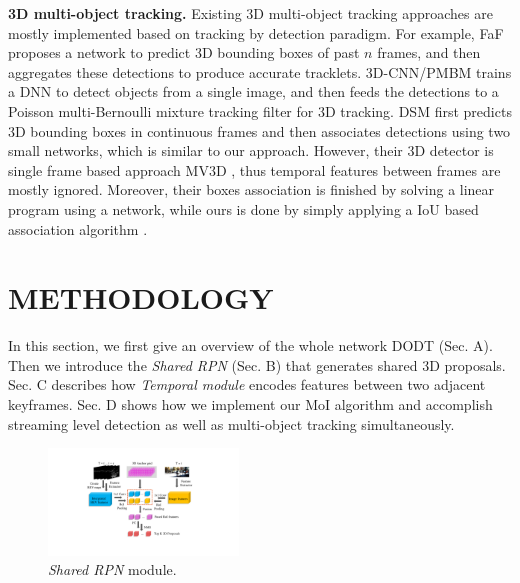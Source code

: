 \documentclass[letterpaper, 10pt, conference]{ieeeconf}  %
\begin{document}
\textbf{3D multi-object tracking.} Existing 3D multi-object tracking approaches are mostly implemented based on tracking by detection paradigm. For example, FaF \cite{luo2018fast} proposes a network to predict 3D bounding boxes of past $n$ frames, and then aggregates these detections to produce accurate tracklets. 3D-CNN/PMBM \cite{scheidegger2018mono} trains a DNN to detect objects from a single image, and then feeds the detections to a Poisson multi-Bernoulli mixture tracking filter for 3D tracking. DSM \cite{frossard2018end} first predicts 3D bounding boxes in continuous frames and then associates detections using two small networks, which is similar to our approach. However, their 3D detector is single frame based approach MV3D \cite{chen2017multi}, thus temporal features between frames are mostly ignored. Moreover, their boxes association is finished by solving a linear program using a network, while ours is done by simply applying a IoU based association algorithm \cite{bochinski2018extending}.

\section{METHODOLOGY}

In this section, we first give an overview of the whole network DODT (Sec. A). Then we introduce the \textit{Shared RPN} (Sec. B) that generates shared 3D proposals. Sec. C describes how \textit{Temporal module} encodes features between two adjacent keyframes. Sec. D shows how we implement our MoI algorithm and accomplish streaming level detection as well as multi-object tracking simultaneously.

\begin{figure}
	\vspace{0.05cm}
	\begin{center}
		\includegraphics[trim={7cm, 3.5cm, 8cm, 2cm}, clip,width=0.45\textwidth]{images/rpn_final.pdf}
	\end{center}
	\caption{\textit{Shared RPN} module.}
	\label{fig:rpn}
	\vspace{-0.6cm}
\end{figure}
\end{document}

